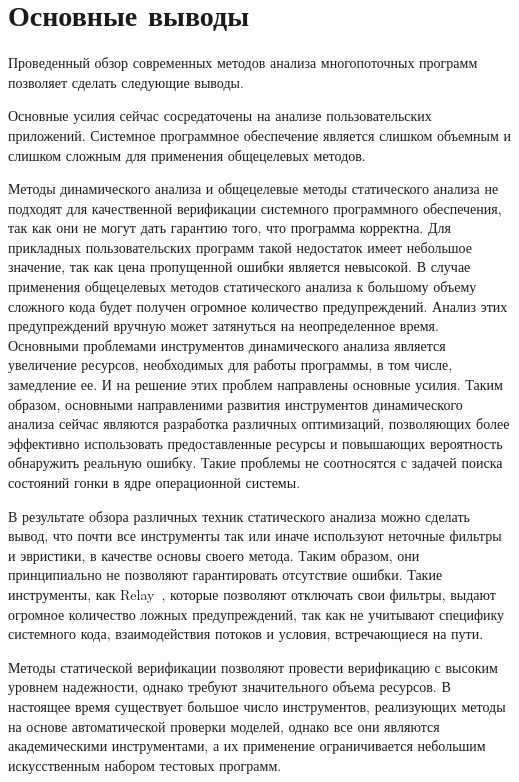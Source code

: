 
\section{Основные выводы}
\label{rw:conclusion}
Проведенный обзор современных методов анализа многопоточных программ позволяет сделать следующие выводы.

Основные усилия сейчас сосредаточены на анализе пользовательских приложений.
Системное программное обеспечение является слишком объемным и слишком сложным для применения общецелевых методов.

Методы динамического анализа и общецелевые методы статического анализа не подходят для качественной верификации системного программного обеспечения, так как они не могут дать гарантию того, что программа корректна.
Для прикладных пользовательских программ такой недостаток имеет небольшое значение, так как цена пропущенной ошибки является невысокой.
В случае применения общецелевых методов статического анализа к большому объему сложного кода будет получен огромное количество предупреждений.
Анализ этих предупреждений вручную может затянуться на неопределенное время.
Основными проблемами инструментов динамического анализа является увеличение ресурсов, необходимых для работы программы, в том числе, замедление ее.
И на решение этих проблем направлены основные усилия.
Таким образом, основными направленими развития инструментов динамического анализа сейчас являются разработка различных оптимизаций, позволяющих более эффективно использовать предоставленные ресурсы и повышающих вероятность обнаружить реальную ошибку.
Такие проблемы не соотносятся с задачей поиска состояний гонки в ядре операционной системы.

В результате обзора различных техник статического анализа можно сделать вывод, что почти все инструменты так или иначе используют неточные фильтры и эвристики, в качестве основы своего метода.
Таким образом, они принципиально не позволяют гарантировать отсутствие ошибки.
Такие инструменты, как Relay~\cite{Relay}, которые позволяют отключать свои фильтры, выдают огромное количество ложных предупреждений, так как не учитывают специфику системного кода, взаимодействия потоков и условия, встречающиеся на пути.

Методы статической верификации позволяют провести верификацию с высоким уровнем надежности, однако требуют значительного объема ресурсов. 
В настоящее время существует большое число инструментов, реализующих методы на основе автоматической проверки моделей, однако все они являются академическими инструментами, а их применение ограничивается небольшим искусственным набором тестовых программ.


